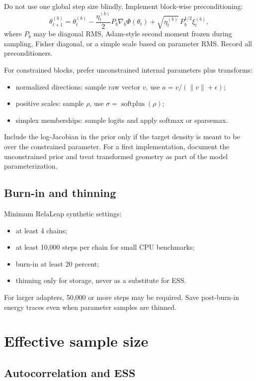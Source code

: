 \documentclass[11pt]{article}
\begin{document}
Do not use one global step size blindly.  Implement block-wise preconditioning:
\begin{equation}
  \theta^{(b)}_{t+1}
  = \theta^{(b)}_t
  - \frac{\eta^{(b)}_t}{2}P_b \nabla_b\Phi(\theta_t)
  + \sqrt{\eta^{(b)}_t}\,P_b^{1/2}\xi^{(b)}_t,
\end{equation}
where $P_b$ may be diagonal RMS, Adam-style second moment frozen during sampling, Fisher diagonal, or a simple scale based on parameter RMS.  Record all preconditioners.

For constrained blocks, prefer unconstrained internal parameters plus transforms:
\begin{itemize}
\item normalized directions: sample raw vector $v$, use $a=v/(\|v\|+\epsilon)$;
\item positive scales: sample $\rho$, use $\sigma=\operatorname{softplus}(\rho)$;
\item simplex memberships: sample logits and apply softmax or sparsemax.
\end{itemize}
Include the log-Jacobian in the prior only if the target density is meant to be over the constrained parameter.  For a first implementation, document the unconstrained prior and treat transformed geometry as part of the model parameterization.

\subsection{Burn-in and thinning}

Minimum RelaLeap synthetic settings:
\begin{itemize}
\item at least 4 chains;
\item at least 10,000 steps per chain for small CPU benchmarks;
\item burn-in at least 20 percent;
\item thinning only for storage, never as a substitute for ESS.
\end{itemize}
For larger adapters, 50,000 or more steps may be required.  Save post-burn-in energy traces even when parameter samples are thinned.

\section{Effective sample size}

\subsection{Autocorrelation and ESS}
\end{document}
